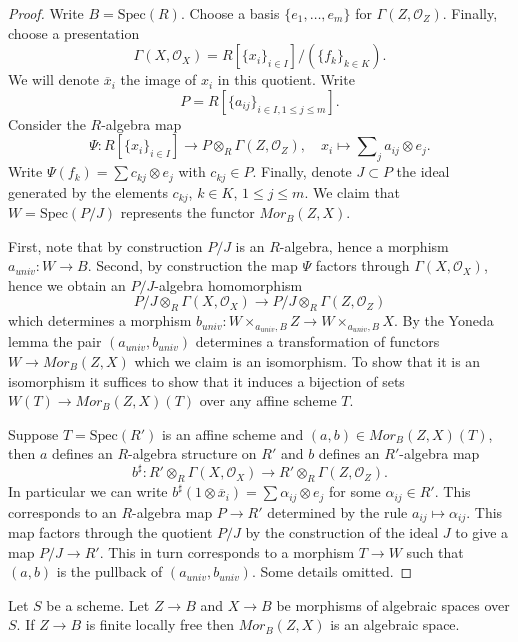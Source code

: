 \begin{proof}
Write $B = \text{Spec}(R)$. Choose a basis $\{e_1, \ldots, e_m\}$
for $\Gamma(Z, \mathcal{O}_Z)$. Finally, choose a presentation
$$
\Gamma(X, \mathcal{O}_X) = R[\{x_i\}_{i \in I}]/(\{f_k\}_{k \in K}).
$$
We will denote $\overline{x}_i$ the image of $x_i$ in this quotient.
Write
$$
P = R[\{a_{ij}\}_{i \in I, 1 \leq j \leq m}].
$$
Consider the $R$-algebra map
$$
\Psi :
R[\{x_i\}_{i \in I}]
\longrightarrow
P \otimes_R \Gamma(Z, \mathcal{O}_Z),\quad
x_i \longmapsto \sum\nolimits_j a_{ij} \otimes e_j.
$$
Write $\Psi(f_k) = \sum c_{kj} \otimes e_j$ with $c_{kj} \in P$.
Finally, denote $J \subset P$ the ideal generated by the elements
$c_{kj}$, $k \in K$, $1 \leq j \leq m$. We claim that
$W = \text{Spec}(P/J)$ represents the functor $\mathit{Mor}_B(Z, X)$.

\medskip\noindent
First, note that by construction $P/J$ is an $R$-algebra, hence
a morphism $a_{univ} : W \to B$. Second, by construction the map
$\Psi$ factors through $\Gamma(X, \mathcal{O}_X)$, hence we obtain
an $P/J$-algebra homomorphism
$$
P/J \otimes_R \Gamma(X, \mathcal{O}_X)
\longrightarrow
P/J \otimes_R \Gamma(Z, \mathcal{O}_Z)
$$
which determines a morphism
$b_{univ} : W \times_{a_{univ}, B} Z \to W \times_{a_{univ}, B} X$.
By the Yoneda lemma the pair $(a_{univ}, b_{univ})$ determines a
transformation of functors $W \to \mathit{Mor}_B(Z, X)$ which we
claim is an isomorphism. To show that it is an isomorphism it suffices
to show that it induces a bijection of sets
$W(T) \to \mathit{Mor}_B(Z, X)(T)$ over any affine
scheme $T$.

\medskip\noindent
Suppose $T = \text{Spec}(R')$ is an affine scheme
and $(a, b) \in \mathit{Mor}_B(Z, X)(T)$, then $a$ defines an
$R$-algebra structure on $R'$ and $b$ defines an $R'$-algebra map
$$
b^\sharp :
R' \otimes_R \Gamma(X, \mathcal{O}_X)
\longrightarrow
R' \otimes_R \Gamma(Z, \mathcal{O}_Z).
$$
In particular we can write
$b^\sharp(1 \otimes \overline{x}_i) = \sum \alpha_{ij} \otimes e_j$
for some $\alpha_{ij} \in R'$. This corresponds to an $R$-algebra map
$P \to R'$ determined by the rule $a_{ij} \mapsto \alpha_{ij}$. This
map factors through the quotient $P/J$ by the construction of the ideal
$J$ to give a map $P/J \to R'$. This in turn corresponds to a morphism
$T \to W$ such that $(a, b)$ is the pullback of $(a_{univ}, b_{univ})$.
Some details omitted.
\end{proof}

\begin{proposition}
\label{proposition-hom-functor-algebraic-space}
Let $S$ be a scheme. Let $Z \to B$ and $X \to B$ be morphisms of
algebraic spaces over $S$. If $Z \to B$ is finite locally free
then $\mathit{Mor}_B(Z, X)$ is an algebraic space.
\end{proposition}

